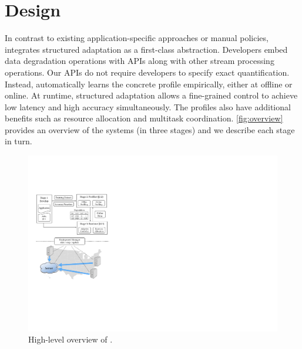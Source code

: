 \section{\sysname{} Design}
\label{sec:system}

In contrast to existing application-specific approaches or manual policies,
\sysname{} integrates structured adaptation as a first-class
abstraction. Developers embed data degradation operations with \maybe{} APIs
along with other stream processing operations. Our APIs do not require
developers to specify exact quantification. Instead, \sysname{} automatically
learns the concrete profile empirically, either at offline or online. At
runtime, structured adaptation allows a fine-grained control to achieve low
latency and high accuracy simultaneously. The profiles also have additional
benefits such as resource allocation and multitask
coordination. \autoref{fig:overview} provides an overview of the systems (in
three stages) and we describe each stage in turn.

\begin{figure}
  \centering
  \includegraphics[width=.9\linewidth]{figures/system.pdf}
  \caption{High-level overview of \sysname{}.}
  \label{fig:overview}
\end{figure}





